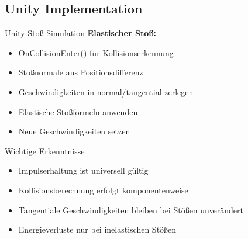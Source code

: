 \subsection{Unity Implementation}

\begin{concept}{Unity Stoß-Simulation}
    \textbf{Elastischer Stoß:}
    \begin{itemize}
        \item OnCollisionEnter() für Kollisionserkennung
        \item Stoßnormale aus Positionsdifferenz
        \item Geschwindigkeiten in normal/tangential zerlegen
        \item Elastische Stoßformeln anwenden
        \item Neue Geschwindigkeiten setzen
    \end{itemize}
\end{concept}

\begin{concept}{Wichtige Erkenntnisse}
    \begin{itemize}
        \item Impulserhaltung ist universell gültig
        \item Kollisionsberechnung erfolgt komponentenweise
        \item Tangentiale Geschwindigkeiten bleiben bei Stößen unverändert
        \item Energieverluste nur bei inelastischen Stößen
    \end{itemize}
\end{concept}